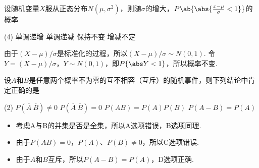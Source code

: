 \begin{problem}
    设随机变量$X$服从正态分布$N(\mu,\sigma^2)$，则随$\sigma$的增大，$P\ab\{\abs{\frac{x-\mu}{\sigma}<1}\}$的概率
    \begin{tasks}(4)
        \task 单调递增
        \task 单调递减
        \task[\true] 保持不变
        \task 增减不定
    \end{tasks}
\end{problem}
\begin{solution}
    由于$(X-\mu)/\sigma$是标准化的过程，所以$(X-\mu)/\sigma\sim N(0,1)$. 令$Y=(X-\mu)/\sigma$，$Y\sim N(0,1)$，即$P\{\abs Y<1\}$，所以概率不变.
\end{solution}

\begin{problem}
    设$A$和$B$是任意两个概率不为零的互不相容（互斥）的随机事件，则下列结论中肯定正确的是
    \begin{tasks}(2)
        \task $P(\overline A~\overline B)\neq0$
        \task $P(\overline A~\overline B)=0$
        \task $P(AB)=P(A)P(B)$
        \task[\true] $P(A-B)=P(A)$
    \end{tasks}
\end{problem}
\begin{solution}\leavevmode
    \begin{itemize}
        \item 考虑A与B的并集是否是全集，所以A选项错误，B选项同理.
        \item 由于$P(AB)=0$，$P(A)$、$P(B)\neq0$，所以C选项错误.
        \item 由于$A$和$B$互斥，所以$P(A-B)=P(A)$，D选项正确.
    \end{itemize}
\end{solution}


